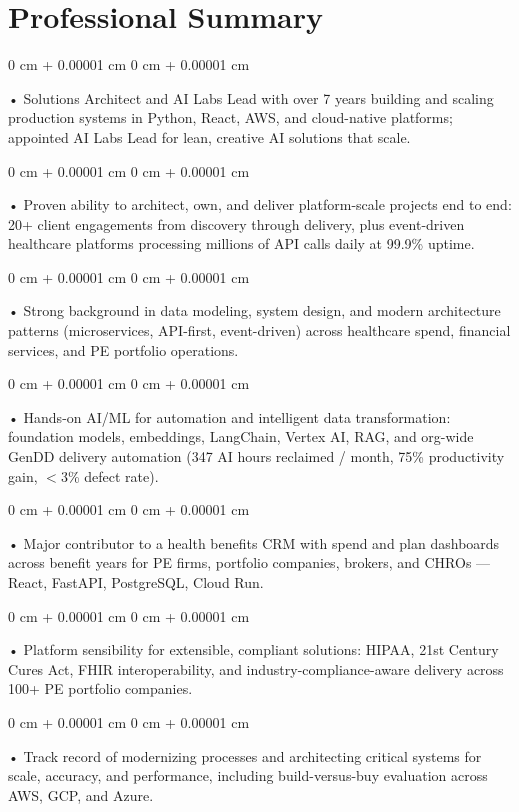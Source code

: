 \documentclass[10pt, letterpaper]{article}
\newenvironment{onecolentry}{
    \begin{adjustwidth}{
        0 cm + 0.00001 cm
    }{
        0 cm + 0.00001 cm
    }
}{
    \end{adjustwidth}
} %
\begin{document}
    \section{Professional Summary}
        \vspace{2 pt }
        \begin{onecolentry}
            • Solutions Architect and AI Labs Lead with over 7 years building and scaling production systems in Python, React, AWS, and cloud-native platforms; appointed AI Labs Lead for lean, creative AI solutions that scale.
        \end{onecolentry}
        \begin{onecolentry}
            • Proven ability to architect, own, and deliver platform-scale projects end to end: 20+ client engagements from discovery through delivery, plus event-driven healthcare platforms processing millions of API calls daily at 99.9\% uptime.
        \end{onecolentry}
        \begin{onecolentry}
            • Strong background in data modeling, system design, and modern architecture patterns (microservices, API-first, event-driven) across healthcare spend, financial services, and PE portfolio operations.
        \end{onecolentry}
        \begin{onecolentry}
            • Hands-on AI/ML for automation and intelligent data transformation: foundation models, embeddings, LangChain, Vertex AI, RAG, and org-wide GenDD delivery automation (347 AI hours reclaimed / month, 75\% productivity gain, $<$3\% defect rate).
        \end{onecolentry}
        \begin{onecolentry}
            • Major contributor to a health benefits CRM with spend and plan dashboards across benefit years for PE firms, portfolio companies, brokers, and CHROs --- React, FastAPI, PostgreSQL, Cloud Run.
        \end{onecolentry}
        \begin{onecolentry}
            • Platform sensibility for extensible, compliant solutions: HIPAA, 21st Century Cures Act, FHIR interoperability, and industry-compliance-aware delivery across 100+ PE portfolio companies.
        \end{onecolentry}
        \begin{onecolentry}
            • Track record of modernizing processes and architecting critical systems for scale, accuracy, and performance, including build-versus-buy evaluation across AWS, GCP, and Azure.
        \end{onecolentry}
\end{document}
